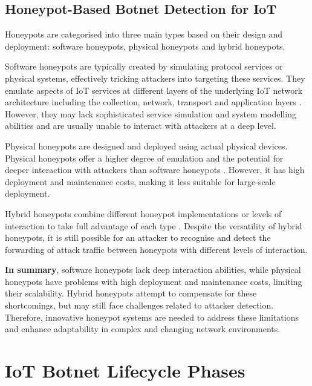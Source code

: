\documentclass[journal]{IEEEtai}
\begin{document}
\subsection{Honeypot-Based Botnet Detection for IoT}
\label{Honeypot-Based Botnet Detection for IoT}

Honeypots are categorised into three main types based on their design and deployment: software honeypots, physical honeypots and hybrid honeypots.

Software honeypots are typically created by simulating protocol services or physical systems, effectively tricking attackers into targeting these services.
They emulate aspects of IoT services at different layers of the underlying IoT network architecture including the collection, network, transport and application layers \cite{9633881, gokhale2020industrial, 10.1145/3474370.3485660}. 
However, they may lack sophisticated service simulation and system modelling abilities and are usually unable to interact with attackers at a deep level.

Physical honeypots are designed and deployed using actual physical devices.
Physical honeypots offer a higher degree of emulation and the potential for deeper interaction with attackers than software honeypots \cite{10.1145/3055186.3055192, 8913891, 10.1145/3372297.3420023}.
However, it has high deployment and maintenance costs, making it less suitable for large-scale deployment.

Hybrid honeypots combine different honeypot implementations or levels of interaction to take full advantage of each type \cite{eb5026c4d31d46f5a5a3a69a997dd63a, wang2019sdn, 10.1145/3584976}.
Despite the versatility of hybrid honeypots, it is still possible for an attacker to recognise and detect the forwarding of attack traffic between honeypots with different levels of interaction.

\textbf{In summary}, software honeypots lack deep interaction abilities, while physical honeypots have problems with high deployment and maintenance costs, limiting their scalability.
Hybrid honeypots attempt to compensate for these shortcomings, but may still face challenges related to attacker detection.
Therefore, innovative honeypot systems are needed to address these limitations and enhance adaptability in complex and changing network environments.







\section{IoT Botnet Lifecycle Phases}
\label{IoT Botnet Lifecycle Phases}
\end{document}
